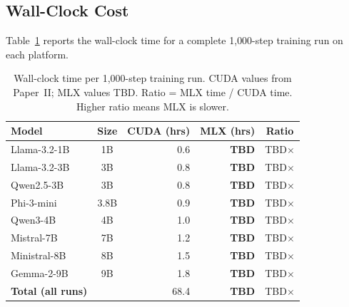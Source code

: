 \documentclass[11pt]{article}
\begin{document}
\subsection{Wall-Clock Cost}
\label{sec:wall-clock}

Table~\ref{tab:wall-clock} reports the wall-clock time for a complete 1{,}000-step training run on each platform.

\begin{table}[t]
\centering
\caption{Wall-clock time per 1{,}000-step training run.  CUDA values from Paper~II; MLX values TBD.  Ratio = MLX time / CUDA time.  Higher ratio means MLX is slower.}
\label{tab:wall-clock}
\begin{tabular}{lc rr c}
\toprule
\textbf{Model} & \textbf{Size} & \textbf{CUDA (hrs)} & \textbf{MLX (hrs)} & \textbf{Ratio} \\
\midrule
Llama-3.2-1B & 1B & 0.6 & \textbf{TBD} & TBD$\times$ \\
Llama-3.2-3B & 3B & 0.8 & \textbf{TBD} & TBD$\times$ \\
Qwen2.5-3B & 3B & 0.8 & \textbf{TBD} & TBD$\times$ \\
Phi-3-mini & 3.8B & 0.9 & \textbf{TBD} & TBD$\times$ \\
Qwen3-4B & 4B & 1.0 & \textbf{TBD} & TBD$\times$ \\
Mistral-7B & 7B & 1.2 & \textbf{TBD} & TBD$\times$ \\
Ministral-8B & 8B & 1.5 & \textbf{TBD} & TBD$\times$ \\
Gemma-2-9B & 9B & 1.8 & \textbf{TBD} & TBD$\times$ \\
\midrule
\textbf{Total (all runs)} & & 68.4 & \textbf{TBD} & TBD$\times$ \\
\bottomrule
\end{tabular}
\end{table}
\end{document}
